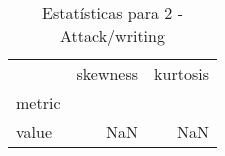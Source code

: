 \begin{table}[htbp]
\caption{Estatísticas para 2 - Attack/writing}
\label{tab:2_-_attack_writing_skewkurt}
\begin{tabular}{lrr}
\toprule
 & skewness & kurtosis \\
metric &  &  \\
\midrule
value & NaN & NaN \\
\bottomrule
\end{tabular}
\end{table}
